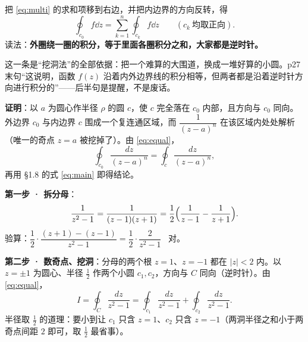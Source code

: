 \documentclass[11pt]{ctexart}
\let\origsubhdr\subhdr
\renewcommand{\subhdr}[1]{\par\needspace{4\baselineskip}\origsubhdr{#1}}
\renewcommand{\qbreak}{\needspace{0.45\textheight}}
\begin{document}

把 \eqref{eq:multi} 的求和项移到右边，并把内边界的方向反转，得
\begin{equation}\label{eq:equal}
\oint_{c_0}f\dd z=\sum_{k=1}^{n}\oint_{c_k}f\dd z\qquad(c_k\ \text{均取正向}).
\end{equation}
读法：\textbf{外圈绕一圈的积分，等于里面各圈积分之和，大家都是逆时针。}

这一条是“挖洞法”的全部依据：把一个难算的大围道，换成一堆好算的小圆。p27 末句“这说明，函数 $f(z)$ 沿着内外边界线的积分相等，但两者都是沿着逆时针方向进行积分的”——后半句是提醒，不是废话。

\qbreak
{}


\textbf{证明}：以 $a$ 为圆心作半径 $\rho$ 的圆 $c$，使 $c$ 完全落在 $c_0$ 内部，且方向与 $c_0$ 同向。外边界 $c_0$ 与内边界 $c$ 围成一个复连通区域，而 $\dfrac{1}{(z-a)^{n}}$ 在该区域内处处解析（唯一的奇点 $z=a$ 被挖掉了）。由 \eqref{eq:equal}，
\[ \oint_{c_0}\frac{dz}{(z-a)^{n}}=\oint_{c}\frac{dz}{(z-a)^{n}} , \]
再用 §1.8 的式 \eqref{eq:main} 即得结论。



\qbreak
{}


\textbf{第一步 · 拆分母}：
\[ \frac{1}{z^{2}-1}=\frac{1}{(z-1)(z+1)}=\frac12\Bigl(\frac{1}{z-1}-\frac{1}{z+1}\Bigr) . \]
验算：$\dfrac12\cdot\dfrac{(z+1)-(z-1)}{z^{2}-1}=\dfrac12\cdot\dfrac{2}{z^{2}-1}$ \ 对。

\textbf{第二步 · 数奇点、挖洞}：分母的两个根 $z=1$、$z=-1$ 都在 $|z|<2$ 内。以 $z=\pm1$ 为圆心、半径 $\tfrac12$ 作两个小圆 $c_1,c_2$，方向与 $C$ 同向（逆时针）。由 \eqref{eq:equal}，
\[ I=\oint_C\frac{dz}{z^{2}-1}=\oint_{c_1}\frac{dz}{z^{2}-1}+\oint_{c_2}\frac{dz}{z^{2}-1} . \]
半径取 $\tfrac12$ 的道理：要小到让 $c_1$ 只含 $z=1$、$c_2$ 只含 $z=-1$（两洞半径之和小于两奇点间距 $2$ 即可，取 $\tfrac12$ 最省事）。
\end{document}
